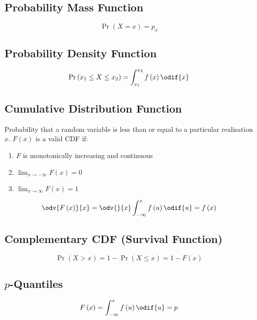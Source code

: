 \documentclass{article}
\begin{document}
\begin{minipage}{126.1962963mm}
\begin{multicols}{2}
        \subsection{Probability Mass Function}
        \begin{equation*}
            \Pr{\left( X = x \right)} = p_x
        \end{equation*}
        \subsection{Probability Density Function}
        \begin{equation*}
            \Pr{\left( x_1 \leq X \leq x_2 \right)} = \int_{x_1}^{x_2} f\left( x \right) \odif{x}
        \end{equation*}
        \subsection{Cumulative Distribution Function}
        Probability that a random variable is less than or equal to a
        particular realisation \(x\). \(F\left( x \right)\) is a valid
        CDF if:
        \begin{enumerate}
            \item \(F\) is monotonically increasing and continuous
            \item \(\lim_{x \to -\infty} F\left( x \right) = 0\)
            \item \(\lim_{x \to \infty} F\left( x \right) = 1\)
        \end{enumerate}
        \begin{equation*}
            \odv{F\left( x \right)}{x} = \odv{}{x} \int_{-\infty}^x f\left( u \right) \odif{u} = f\left( x \right)
        \end{equation*}
        \subsection{Complementary CDF (Survival Function)}
        \begin{equation*}
            \Pr{\left( X > x \right)} = 1 - \Pr{\left( X \leq x \right)} = 1 - F\left( x \right)
        \end{equation*}
        \subsection{\texorpdfstring{\(p\)}{p}-Quantiles}
        \begin{equation*}
            F\left( x \right) = \int_{-\infty}^x f\left( u \right) \odif{u} = p
        \end{equation*}

\end{multicols}
\end{minipage}
\end{document}
